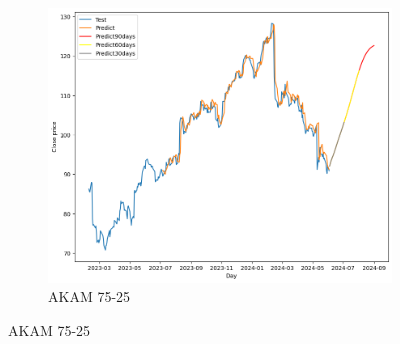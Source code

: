\documentclass{ieeeojies}
\begin{document}
\begin{figure}[H]
    \hfill
    \begin{subfigure}[b]{0.33\linewidth}
        \centering
        \includegraphics[width=\linewidth]{LSTM Plot/AKAM_LSTM_75_25.png}
        \caption{AKAM 75-25}
        \label{fig:akam-75-25}
    \end{subfigure}
\end{figure}
 \vspace{-20pt}
\end{document}
